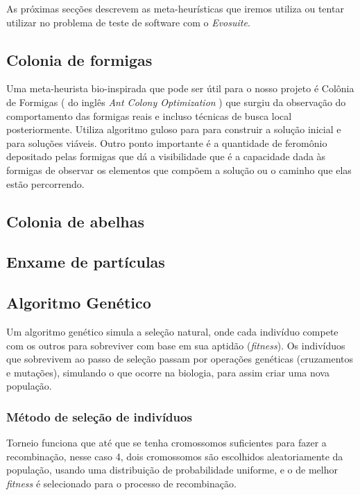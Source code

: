 \documentclass[conference]{IEEEtran}
\begin{document}
As próximas secções descrevem as meta-heurísticas que iremos utiliza ou tentar utilizar no problema de teste de software com o \textit{Evosuite}.

\subsection{Colonia de formigas}

Uma meta-heurista bio-inspirada que pode ser útil para o nosso projeto é Colônia de Formigas \cite{dorigo1999ant} ( do inglês \textit{Ant Colony Optimization} ) que surgiu da observação do
comportamento das formigas reais e incluso técnicas de busca local posteriormente. Utiliza algoritmo guloso para para construir a solução inicial e para soluções viáveis. Outro ponto
importante é a quantidade de feromônio depositado pelas formigas que dá a visibilidade que é a capacidade dada às formigas de observar os elementos que compõem a solução ou o caminho que
elas estão percorrendo.





\subsection{Colonia de abelhas}

\subsection{Enxame de partículas}

\subsection{Algoritmo Genético}
\label{sec:alg_genetic}



Um algoritmo genético simula a seleção natural, onde cada indivíduo compete com os outros para sobreviver com base em sua aptidão (\emph{fitness}). Os indivíduos que sobrevivem ao passo de
seleção passam por operações genéticas (cruzamentos e mutações), simulando o que ocorre na biologia, para assim criar uma nova população.

    \subsubsection{Método de seleção de indivíduos}

        Torneio funciona que até que se tenha cromossomos suficientes para fazer a recombinação, nesse caso 4, dois cromossomos são escolhidos aleatoriamente da população, usando uma distribuição de
        probabilidade uniforme, e o de melhor \textit{fitness} é selecionado para o processo de recombinação.
\end{document}
